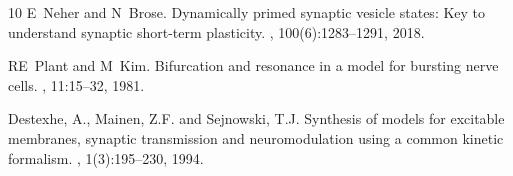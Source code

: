 \documentclass[nofootinbib,aip,amsmath,amssymb,reprint,twocolumn,10pt]{revtex4-2}
\begin{document}
\begin{thebibliography}{10}
E~Neher and N~Brose.
\newblock Dynamically primed synaptic vesicle states: Key to understand synaptic short-term plasticity.
, 100(6):1283--1291, 2018.

RE~Plant and M~Kim.
\newblock Bifurcation and resonance in a model for bursting nerve cells.
, 11:15--32, 1981.

Destexhe, A., Mainen, Z.F. and Sejnowski, T.J.
\newblock Synthesis of models for excitable membranes, synaptic transmission and neuromodulation using a common kinetic formalism.
, 1(3):195--230, 1994.

\end{thebibliography}
\end{document}
